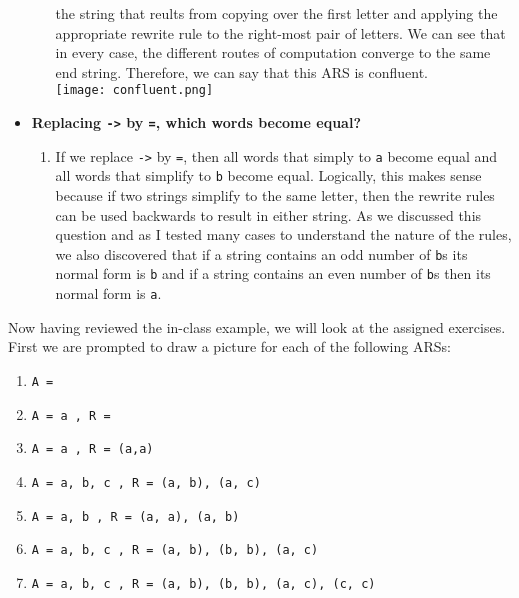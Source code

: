 \documentclass{article}
\theoremstyle{theorem}
\theoremstyle{definition}
\theoremstyle{remark}
\begin{document}
\begin{itemize}
\begin{enumerate}
      the string that reults from copying over the first letter and applying the appropriate rewrite rule to the right-most pair of letters. We can see that in every case, the different 
      routes of computation converge to the same end string. Therefore, we can say that this ARS is confluent. \\
      \texttt{[image: confluent.png]}\\
    \end{enumerate}
  \item \textbf{Replacing \texttt{->} by \texttt{=}, which words become equal?}
    \begin{enumerate} 
      \item[] If we replace \texttt{->} by \texttt{=}, then all words that simply to \texttt{a} become equal and all words that simplify to 
      \texttt{b} become equal. Logically, this makes sense because if two strings simplify to the same letter, then the rewrite rules can be used backwards to result in either 
      string. As we discussed this question and as I tested many cases to understand the nature of the rules, we also discovered that if a string contains an odd number of \texttt{b}s its 
      normal form is \texttt{b} and if a string contains an even number of \texttt{b}s then its normal form is \texttt{a}.
    \end{enumerate}
\end{itemize}



Now having reviewed the in-class example, we will look at the assigned exercises. First we are prompted to draw a picture for each of the following ARSs:
\begin{enumerate}
  \item \texttt{A = {}}
  \item \texttt{A = {a} , R = {}}
  \item \texttt{A = {a} , R = {(a,a)}}
  \item \texttt{A = {a, b, c} , R = {(a, b), (a, c)}}
  \item \texttt{A = {a, b} , R = {(a, a), (a, b)}}
  \item \texttt{A = {a, b, c} , R = {(a, b), (b, b), (a, c)}}
  \item \texttt{A = {a, b, c} , R = {(a, b), (b, b), (a, c), (c, c)}}
\end{enumerate}
\end{document}
